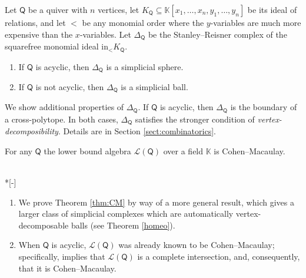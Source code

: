 \documentclass[ALCO,published]{cedram}
\numberwithin{equation}{section}
\renewcommand{\L}{\mathcal{L}}%
\newcommand{\1}{^{-1}}
\def\Q{\mathsf{Q}}
\begin{document}
\begin{thm}\label{thm:CM}
Let $\Q$ be a quiver with $n$ vertices, let $K_\Q\subseteq \mathbb{K}[x_1,\dots,x_n,y_1,\dots,y_n]$ be its ideal of relations, and let $<$ be any monomial order where the $y$-variables are much more expensive than the $x$-variables. Let $\Delta_\Q$ be the Stanley--Reisner complex of the squarefree monomial ideal $\textrm{in}_< K_\Q$.
\begin{enumerate}
\item If $\Q$ is acyclic, then $\Delta_\Q$ is a simplicial sphere.
\item If $\Q$ is not acyclic, then $\Delta_\Q$ is a simplicial ball.
\end{enumerate}
\end{thm}

\noindent We show additional properties of $\Delta_\Q$.  If $\Q$ is acyclic, then $\Delta_\Q$ is the boundary of a cross-polytope.  In both cases, $\Delta_\Q$ satisfies the stronger condition of \emph{vertex-decomposibility}. Details are in Section \ref{sect:combinatorics}.

\begin{cor}
For any $\Q$ the lower bound algebra $\L(\Q)$ over a field $\mathbb{K}$ is Cohen--Macaulay.
\end{cor}



\begin{rems}~\\*[-\baselineskip]
\begin{enumerate}
\item We prove Theorem \ref{thm:CM} by way of a more general result, which gives a larger class of simplicial complexes which are automatically vertex-decomposable balls (see Theorem \ref{homeo}).
\item When $\Q$ is acyclic, $\L(\Q)$ was already known to be Cohen--Macaulay; specifically, \cite[Corollary 1.17]{BFZ05} implies that $\L(\Q)$ is a complete intersection, and, consequently, that it is Cohen--Macaulay.
\end{enumerate}
\end{rems}
\end{document}
